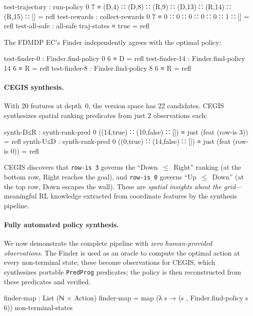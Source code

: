 \begin{spec}
test-trajectory : run-policy 0 7
  ≡ (D,4) ∷ (D,8) ∷ (R,9) ∷ (D,13) ∷ (R,14) ∷ (R,15) ∷ []  = refl
test-rewards : collect-rewards 0 7 ≡ 0 ∷ 0 ∷ 0 ∷ 0 ∷ 0 ∷ 1 ∷ []   = refl
test-all-safe : all-safe traj-states ≡ true                          = refl
\end{spec}

\noindent The FDMDP EC's Finder independently agrees with the optimal policy:

\begin{spec}
test-finder-0  : Finder.find-policy 0  6 ≡ D  = refl
test-finder-14 : Finder.find-policy 14 6 ≡ R  = refl
test-finder-8  : Finder.find-policy 8  6 ≡ R  = refl
\end{spec}

\paragraph{CEGIS synthesis.}
With 20 features at depth~0, the version space has 22 candidates.  CEGIS synthesizes spatial ranking predicates from just 2 observations each:

\begin{spec}
synth-D≤R : synth-rank-pred 0 ((14,true) ∷ (10,false) ∷ [])
           ≡ just (feat (row-is 3))                            = refl
synth-U≤D : synth-rank-pred 0 ((0,true) ∷ (14,false) ∷ [])
           ≡ just (feat (row-is 0))                            = refl
\end{spec}

\noindent CEGIS discovers that \texttt{row-is~3} governs the ``Down~$\leq$~Right'' ranking (at the bottom row, Right reaches the goal), and \texttt{row-is~0} governs ``Up~$\leq$~Down'' (at the top row, Down escapes the wall).  These are \emph{spatial insights about the grid}---meaningful RL knowledge extracted from coordinate features by the synthesis pipeline.

\paragraph{Fully automated policy synthesis.}
We now demonstrate the complete pipeline with \emph{zero human-provided observations}.  The Finder is used as an oracle to compute the optimal action at every non-terminal state; these become observations for CEGIS, which synthesizes portable \texttt{PredProg} predicates; the policy is then reconstructed from these predicates and verified.

\begin{spec}
finder-map : List (ℕ × Action)
finder-map = map (λ s → (s , Finder.find-policy s 6)) non-terminal-states
\end{spec}

